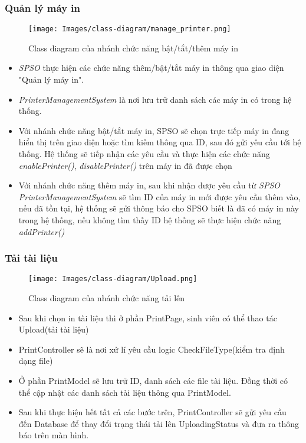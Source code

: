 \subsubsection{Quản lý máy in}
\begin{figure}[H]
    \centering
    \texttt{[image: Images/class-diagram/manage\_printer.png]}
    \newline
    \newline
    \caption{Class diagram của nhánh chức năng bật/tắt/thêm máy in}
    \label{fig:enter-label}
\end{figure}
\begin{itemize}
    \item \textit{SPSO} thực hiện các chức năng thêm/bật/tắt máy in thông qua giao diện "Quản lý máy in".
    \item \textit{PrinterManagementSystem} là nơi lưu trữ danh sách các máy in có trong hệ thống.
    \item Với nhánh chức năng bật/tắt máy in, SPSO sẽ chọn trực tiếp máy in đang hiển thị trên giao diện hoặc tìm kiếm thông qua ID, sau đó gửi yêu cầu tới hệ thống. Hệ thống sẽ tiếp nhận các yêu cầu và thực hiện các chức năng \textit{enablePrinter()}, \textit{disablePrinter()} trên máy in đã được chọn
    \item Với nhánh chức năng thêm máy in, sau khi nhận được yêu cầu từ \textit{SPSO} \textit{PrinterManagementSystem} sẽ tìm ID của máy in mới được yêu cầu thêm vào, nếu đã tồn tại, hệ thống sẽ gửi thông báo cho SPSO biết là đã có máy in này trong hệ thống, nếu không tìm thấy ID hệ thống sẽ thực hiện chức năng \textit{addPrinter()}
\end{itemize}
\newpage
\subsubsection{Tải tài liệu}
\begin{figure}[H]
    \centering
    \texttt{[image: Images/class-diagram/Upload.png]}
    \newline
    \newline
    \caption{Class diagram của nhánh chức năng tải lên}
    \label{fig:enter-label}
\end{figure}

\begin{itemize}
    \item Sau khi chọn in tài liệu thì ở phần PrintPage, sinh viên có thể thao tác Upload(tải tài liệu)
    \item PrintController sẽ là nơi xử lí yêu cầu logic CheckFileType(kiểm tra định dạng file)
    \item Ở phần PrintModel sẽ lưu trữ ID, danh sách các file tài liệu. Đồng thời có thể cập nhật các danh sách tài liệu thông qua PrintModel.

    \item Sau khi thực hiện hết tất cả các bước trên, PrintController sẽ gửi yêu cầu đến Database để thay đổi trạng thái tải lên UploadingStatus và đưa ra thông báo trên màn hình.
\end{itemize}

